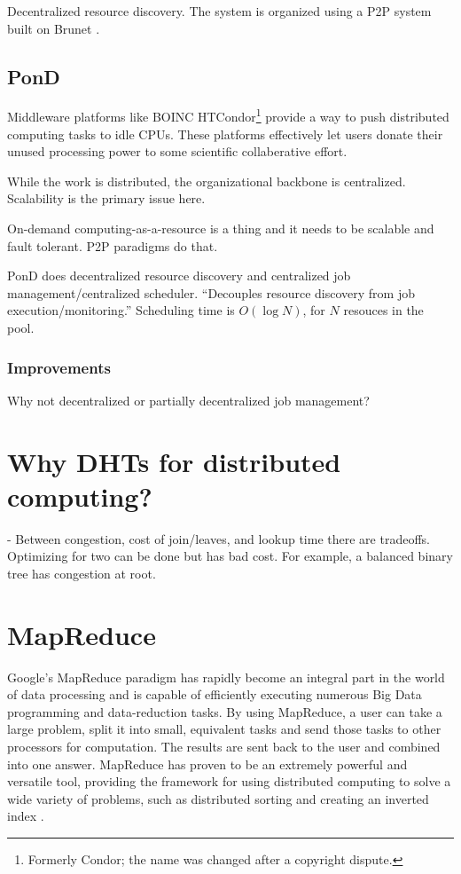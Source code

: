 Decentralized resource discovery.
The system is organized using a P2P system built on Brunet \cite{brunet}.





\subsection{PonD}

Middleware platforms like BOINC \cite{anderson2004boinc} HTCondor\footnote{Formerly Condor; the name was changed after a copyright dispute.} \cite{thain2005distributed} provide a way to push distributed computing tasks to idle CPUs.
These platforms effectively let users donate their unused processing power to some scientific collaberative effort.

While the work is distributed, the organizational backbone  is centralized.
Scalability is the primary issue here.


On-demand computing-as-a-resource is a thing and it needs to be scalable and fault tolerant.
P2P paradigms do that.

PonD \cite{lee2012pond} does decentralized resource discovery and centralized job management/centralized scheduler.
``Decouples resource discovery from job execution/monitoring.''
Scheduling time is $ O(\log N) $, for $N$ resouces in the pool.

\subsubsection{Improvements}
Why not decentralized or partially decentralized job management?


\section{Why DHTs for distributed computing?}

\cite{malkhi2001viceroy} -  Between congestion, cost of join/leaves, and lookup time there are tradeoffs.  
Optimizing for two can be done but has bad cost.
For example, a balanced binary tree has congestion at root.


\section{MapReduce}

Google's MapReduce \cite{mapreduce} paradigm has rapidly become an integral part in the world of data processing and is capable of efficiently executing numerous Big Data programming and data-reduction tasks.  
By using MapReduce, a user can take a large problem, split it into small, equivalent tasks and send those tasks to other processors for computation.  
The results are sent back to the user and combined into one answer.  
MapReduce has proven to be an extremely powerful and versatile tool, providing the framework for using distributed computing to solve a wide variety of problems, such as distributed sorting and creating an inverted index \cite{mapreduce}. 

